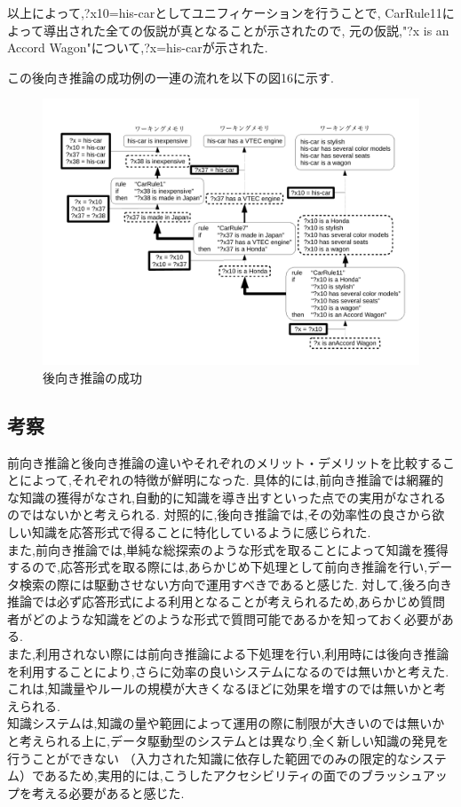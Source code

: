 \documentclass[uplatex,12pt]{jsarticle}
\begin{document}
\newpage

以上によって,?x10=his-carとしてユニフィケーションを行うことで,
CarRule11によって導出された全ての仮説が真となることが示されたので,
元の仮説,"?x is an Accord Wagon"について,?x=his-carが示された.

この後向き推論の成功例の一連の流れを以下の図16に示す.
\begin{figure}[!hbt]
    \centering
    \includegraphics[scale=0.40]{images/backward_chaining_12.pdf}
    \caption{後向き推論の成功}
\end{figure}

\newpage

\subsection{考察}
前向き推論と後向き推論の違いやそれぞれのメリット・デメリットを比較することによって,それぞれの特徴が鮮明になった.
具体的には,前向き推論では網羅的な知識の獲得がなされ,自動的に知識を導き出すといった点での実用がなされるのではないかと考えられる.
対照的に,後向き推論では,その効率性の良さから欲しい知識を応答形式で得ることに特化しているように感じられた. \\
また,前向き推論では,単純な総探索のような形式を取ることによって知識を獲得するので,応答形式を取る際には,あらかじめ下処理として前向き推論を行い,データ検索の際には駆動させない方向で運用すべきであると感じた.
対して,後ろ向き推論では必ず応答形式による利用となることが考えられるため,あらかじめ質問者がどのような知識をどのような形式で質問可能であるかを知っておく必要がある. \\
また,利用されない際には前向き推論による下処理を行い,利用時には後向き推論を利用することにより,さらに効率の良いシステムになるのでは無いかと考えた.
これは,知識量やルールの規模が大きくなるほどに効果を増すのでは無いかと考えられる. \\
知識システムは,知識の量や範囲によって運用の際に制限が大きいのでは無いかと考えられる上に,データ駆動型のシステムとは異なり,全く新しい知識の発見を行うことができない
（入力された知識に依存した範囲でのみの限定的なシステム）であるため,実用的には,こうしたアクセシビリティの面でのブラッシュアップを考える必要があると感じた.
\end{document}
